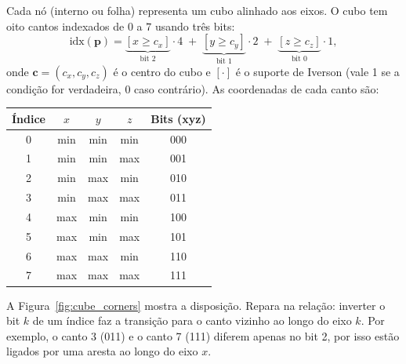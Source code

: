\documentclass[10pt,a4paper]{article}
\begin{document}
Cada nó (interno ou folha) representa um cubo alinhado aos eixos.
O cubo tem oito cantos indexados de $0$ a $7$ usando três bits:
\begin{equation}
  \label{eq:corner_index}
  \text{idx}(\mathbf{p}) =
    \underbrace{[x \geq c_x]}_{\text{bit 2}} \cdot 4 \;+\;
    \underbrace{[y \geq c_y]}_{\text{bit 1}} \cdot 2 \;+\;
    \underbrace{[z \geq c_z]}_{\text{bit 0}} \cdot 1,
\end{equation}
onde $\mathbf{c} = (c_x,c_y,c_z)$ é o centro do cubo e $[\cdot]$
é o suporte de Iverson (vale 1 se a condição for verdadeira, 0 caso
contrário). As coordenadas de cada canto são:

\begin{center}
\begin{tabular}{c|c|c|c|c}
  \toprule
  Índice & $x$ & $y$ & $z$ & Bits (xyz)\\
  \midrule
  0 & min & min & min & 000 \\
  1 & min & min & max & 001 \\
  2 & min & max & min & 010 \\
  3 & min & max & max & 011 \\
  4 & max & min & min & 100 \\
  5 & max & min & max & 101 \\
  6 & max & max & min & 110 \\
  7 & max & max & max & 111 \\
  \bottomrule
\end{tabular}
\end{center}

A Figura~\ref{fig:cube_corners} mostra a disposição. Repara na
relação: inverter o bit $k$ de um índice faz a transição para o canto
vizinho ao longo do eixo $k$. Por exemplo, o canto 3 (011) e o canto
7 (111) diferem apenas no bit 2, por isso estão ligados por uma
aresta ao longo do eixo $x$.
\end{document}
